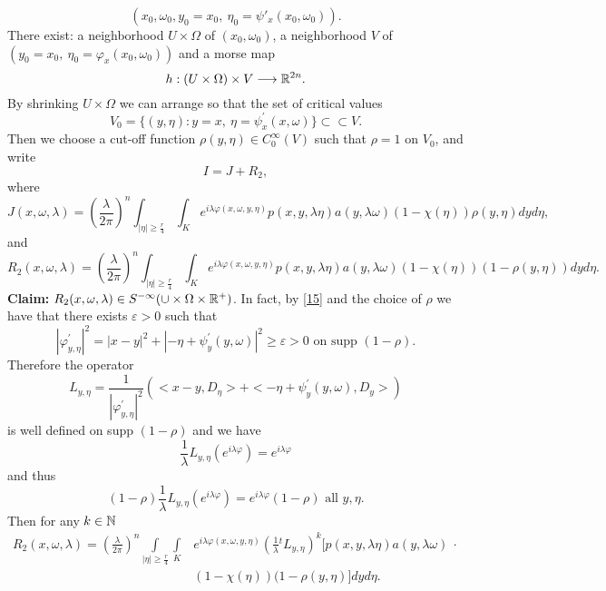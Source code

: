 \documentclass[12pt,reqno]{amsart}
\theoremstyle{plain}  %
\theoremstyle{definition}
\newcommand{\ve}{\varepsilon}
\newcommand{\nin}{\noindent}
\newcommand{\vph}{\varphi}
\begin{document}
$$(x_0, \omega_0, y_0 = x_0, \ \eta_0 = \psi'_x (x_0, \omega_0)). $$
There exist:  a neighborhood $ U \times \Omega $ of  $(x_0, \omega_0)$, a
neighborhood $ V $ of $ (y_0 = x_0, \ \eta_0 = \vph_x (x_0, \omega_0)) $ and a
morse map
$$h: (U \times \Omega)\times V \longrightarrow \Bbb R^{2n}. $$
By shrinking $ U \times \Omega $ we can arrange so that the set of critical
values
\begin{equation}
	\label{15}
	V_0 = \{ (y, \eta): y = x, \ \eta = \psi^\prime_x (x, \omega) \} \subset
\subset V. 
\end{equation}
Then we choose a cut-off function $ \rho(y, \eta) \in C^\infty_0 (V) $ such that
$ \rho = 1 $ on $ V_0$, and write
$$I = J + R_2, $$
where
\begin{equation}
	\label{16}J(x, \omega, \lambda) =
\left ( \frac{\lambda}{2 \pi} \right )^n \int_{|\eta| \ge \frac{r}{4}} \int_K e^{i
\lambda \vph(x, \omega, y, \eta)} p(x, y, \lambda \eta) a(y, \lambda \omega) (1
- \chi(\eta)) \rho(y, \eta) dy d\eta, 
\end{equation}
and
$$R_2 (x, \omega, \lambda) =
\left ( \frac{\lambda}{2 \pi} \right )^n \int_{|\eta| \ge \frac{r}{4}} \int_K e^{i
\lambda \vph(x, \omega, y, \eta)} 
p(x, y, \lambda \eta) a(y, \lambda \omega) (1
- \chi(\eta)) (1-\rho(y, \eta)) dy d\eta.$$
\nin
{\bf Claim: }  $ R_2 (x, \omega, \lambda) \in S^{- \infty} (\cup \times
\Omega \times \Bbb R^+)$.
\vskip0.1in
\nin
In fact, by \eqref{15} and the choice of $ \rho $ we have that there exists $ \ve > 0 $
such that
$$|\vph^\prime_{y, \eta}|^2 = |x-y|^2 + |- \eta + \psi^\prime_y (y, \omega)|^2
\ge \ve > 0 \text{ on supp } (1 - \rho). $$
Therefore the operator
$$L_{y, \eta} = \frac{1}{|\vph^\prime_{y, \eta}|^2} \left ( <x-y, D_\eta> + <- \eta
+ \psi^\prime_y (y, \omega), D_y> \right )$$
is well defined on supp $(1 - \rho) $ and we have
$$\frac{1}{\lambda} L_{y, \eta} \left ( e^{i \lambda \vph} \right ) = e^{i \lambda
\vph}$$
and thus
$$(1 - \rho) \frac{1}{\lambda} L_{y, \eta} \left ( e^{i \lambda \vph} \right ) =
e^{i \lambda \vph} (1 - \rho) \text{ all } y, \eta. $$
Then for any $ k \in \Bbb N $
\begin{equation}
	\begin{split}
R_2 (x, \omega, \lambda) =  \left (
\frac{\lambda}{2 \pi} \right )^n \int\limits_{|\eta| \ge \frac{r}{4}} \int\limits_K
& e^{i \lambda \vph(x, \omega,  y, \eta)}\left  ( \frac{1}{\lambda} {}^tL_{y, \eta} 
\right )^k  \big [ p(x, y, \lambda \eta  ) a(y, \lambda \omega) \  \cdot \\
& (1
- \chi (\eta) ) (1 - \rho(y, \eta) \big ] dy d \eta. \end{split}
\end{equation}
\end{document}
